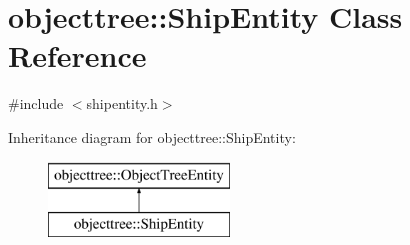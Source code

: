 \hypertarget{classobjecttree_1_1_ship_entity}{}\section{objecttree\+::Ship\+Entity Class Reference}
\label{classobjecttree_1_1_ship_entity}


{\ttfamily \#include $<$shipentity.\+h$>$}

Inheritance diagram for objecttree\+::Ship\+Entity\+:\begin{figure}[H]
\begin{center}
\leavevmode
\includegraphics[height=2.000000cm]{de/d28/classobjecttree_1_1_ship_entity}
\end{center}
\end{figure}
